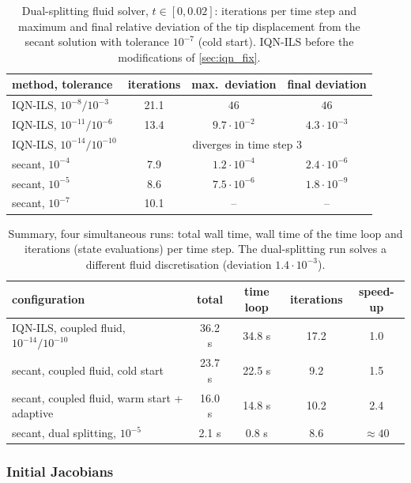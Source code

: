 \documentclass[11pt,a4paper]{article}
\theoremstyle{definition}
\theoremstyle{remark}
\begin{document}
\begin{table}[ht]\centering
\caption{Dual-splitting fluid solver, $t\in[0,0.02]$: iterations per time step and maximum and
final relative deviation of the tip displacement from the secant solution with tolerance $10^{-7}$
(cold start). IQN-ILS before the modifications of \cref{sec:iqn_fix}.}
\label{tab:splitting}
\begin{tabular}{lccc}
\toprule
method, tolerance & iterations & max.\ deviation & final deviation\\
\midrule
IQN-ILS, $10^{-8}/10^{-3}$ & 21.1 & $46$ & $46$\\
IQN-ILS, $10^{-11}/10^{-6}$ & 13.4 & $9.7\cdot10^{-2}$ & $4.3\cdot10^{-3}$\\
IQN-ILS, $10^{-14}/10^{-10}$ & \multicolumn{3}{c}{diverges in time step 3}\\
secant, $10^{-4}$ & 7.9 & $1.2\cdot10^{-4}$ & $2.4\cdot10^{-6}$\\
secant, $10^{-5}$ & 8.6 & $7.5\cdot10^{-6}$ & $1.8\cdot10^{-9}$\\
secant, $10^{-7}$ & 10.1 & -- & --\\
\bottomrule
\end{tabular}
\end{table}

\begin{table}[ht]\centering
\caption{Summary, four simultaneous runs: total wall time, wall time of the time loop and
iterations (state evaluations) per time step. The dual-splitting run solves a different fluid
discretisation (deviation $1.4\cdot10^{-3}$).}\label{tab:speedup}
\begin{tabular}{lcccc}
\toprule
configuration & total & time loop & iterations & speed-up\\
\midrule
IQN-ILS, coupled fluid, $10^{-14}/10^{-10}$ & 36.2 s & 34.8 s & 17.2 & 1.0\\
secant, coupled fluid, cold start & 23.7 s & 22.5 s & 9.2 & 1.5\\
secant, coupled fluid, warm start + adaptive & 16.0 s & 14.8 s & 10.2 & 2.4\\
secant, dual splitting, $10^{-5}$ & 2.1 s & 0.8 s & 8.6 & $\approx40$\\
\bottomrule
\end{tabular}
\end{table}

\subsubsection{Initial Jacobians}\label{sec:initial_jacobian}
\end{document}
